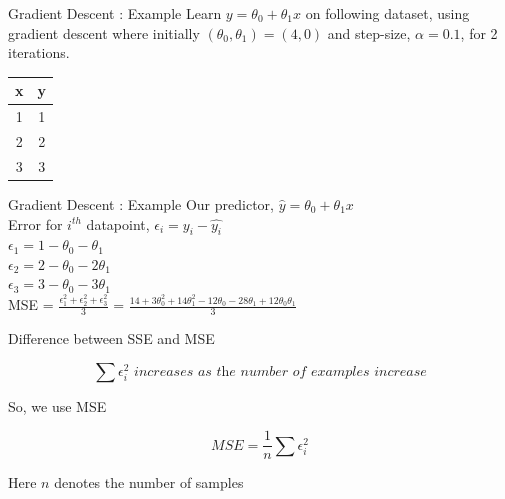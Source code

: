 \documentclass[usenames,dvipsnames]{beamer}
\begin{document}
    \begin{frame}{Gradient Descent : Example}
        Learn $y = \theta_0 + \theta_1 x$ on following dataset, using gradient descent where initially $(\theta_0, \theta_1) = (4,0)$ and step-size, $\alpha = 0.1$, for 2 iterations. 
        \begin{table}[]
            \centering
            \label{tab:my-table}
            \begin{tabular}{|c|c|}
                \hline
                \textbf{x} & \textbf{y} \\ \hline
                1 & 1 \\ \hline
                2 & 2 \\ \hline
                3 & 3 \\ \hline
            \end{tabular}
        \end{table}
        \end{frame}
        
        

    \begin{frame}{Gradient Descent : Example}
        Our predictor, $\hat{y} = \theta_0 + \theta_1x$\\
        \vspace{1cm}
        Error for $i^{th}$ datapoint, $\epsilon_i = y_i - \hat{y_i}$\\
        $\epsilon_1 = 1 - \theta_0 - \theta_1$ \\
        $\epsilon_2 = 2 - \theta_0 - 2\theta_1$ \\
        $\epsilon_3 = 3 - \theta_0 - 3\theta_1$ \\
        
        \vspace{1cm}
        MSE = $\frac{\epsilon_1^2 + \epsilon_2^2 + \epsilon_3^2}{3}$ = $\frac{14 + 3\theta_0^2 + 14\theta_1^2 -12\theta_0 - 28\theta_1 + 12\theta_0\theta_1}{3}$\\
        \end{frame}
        
            \begin{frame}{Difference between SSE and MSE}
        
        
        
        \begin{equation*}
        \sum \epsilon_{i}^{2} \textit{ increases as the number of examples increase}
        \end{equation*}
        
        So, we use MSE
        
        \begin{equation*}
        \textit{MSE} = \frac{1}{n} \sum \epsilon_{i}^{2}
        \end{equation*}
        
        Here $n$ denotes the number of samples
        
        
        
        \end{frame}
\end{document}
